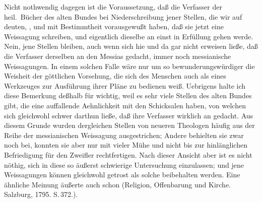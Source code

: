 \begin{RWanm}
Nicht nothwendig dagegen ist die Voraussetzung, daß die Verfasser der heil.\ Bücher des alten Bundes bei Niederschreibung jener Stellen, die wir auf  deuten, , und mit Bestimmtheit vorausgewußt haben, daß sie jetzt eine Weissagung schreiben, und  eigentlich dieselbe an  einst in Erfüllung gehen werde. Nein, jene Stellen bleiben, auch wenn sich hie und da gar nicht erweisen ließe, daß die Verfasser derselben an den Messias gedacht, immer noch messianische Weissagungen. In einem solchen Falle wäre nur um so bewunderungswürdiger die Weisheit der göttlichen Vorsehung, die sich des Menschen auch als eines  Werkzeuges zur Ausführung ihrer Pläne zu bedienen weiß. Uebrigens halte ich diese Bemerkung deßhalb für wichtig, weil es sehr viele Stellen des alten Bundes gibt, die eine auffallende Aehnlichkeit mit den Schicksalen  haben, von welchen sich gleichwohl schwer darthun ließe, daß ihre Verfasser wirklich an  gedacht. Aus diesem Grunde wurden dergleichen Stellen von neueren Theologen häufig aus der Reihe der messianischen Weissagung ausgestrichen; Andere behielten sie zwar noch bei, konnten sie aber nur mit vieler Mühe und nicht bis zur hinlänglichen Befriedigung für den Zweifler rechtfertigen. Nach dieser Ansicht aber ist es nicht nöthig, sich in diese so äußerst schwierige Untersuchung einzulassen; und jene Weissagungen können gleichwohl getrost als solche beibehalten werden. Eine ähnliche Meinung äußerte auch schon  (Religion, Offenbarung und Kirche. Salzburg, 1795. S.\,372.).
\end{RWanm}

